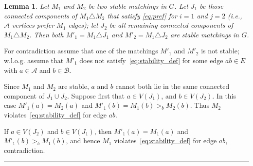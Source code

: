 \documentclass[3p,times]{elsarticle}
\newtheorem{lemma}[fact]{Lemma}
\newenvironment{proof}{{\bf Proof:  }}{\hfill\rule{2mm}{2mm}}
\newcommand{\cA}{\mathcal{A}} \newcommand{\cB}{\mathcal{B}}
\begin{document}
\begin{lemma}\label{lemma:sym_stable} 
  Let $M_1$ and $M_2$ be two stable matchings in $G$. Let $J_1$ be
  those connected components of $M_1 \triangle M_2$ 
  that satisfy
  \eqref{eq:pref} for $i=1$ and $j=2$ (i.e., $\cA$ vertices prefer
  $M_1$ edges); let $J_2$ be all
  remaining connected components of $M_1 \triangle M_2$. 
  Then both $M'_1 = M_1\triangle J_1$ and
  $M'_2=M_1\triangle J_2$ are stable matchings in $G$.
\end{lemma}
\begin{proof}
  For contradiction assume
  that one of the matchings $M'_1$ and $M'_2$ is not stable; w.l.o.g. assume that
  $M'_1$ does not satisfy~\eqref{eq:stability_def} for some edge
  $ab\in E$ with $a\in\mathcal{A}$ and $b\in\mathcal{B}$.

  Since $M_1$ and $M_2$ are stable, $a$ and $b$ cannot both lie in the
  same connected component of $J_1 \cup J_2$. Suppose first that $a \in
  V(J_1)$, and $b \in V(J_2)$. In this case $M'_1(a)=M_2(a)$ and
  $M'_1(b) = M_1(b) >_b M_2(b)$. Thus $M_2$
  violates~\eqref{eq:stability_def} for edge $ab$. 

  If $a\in V(J_2)$
  and $b\in V(J_1)$, then $M'_1(a)=M_1(a)$ and $M'_1(b)>_b M_1(b)$,
  and hence $M_1$ violates~\eqref{eq:stability_def} for edge $ab$,
  contradiction.
\end{proof}
\end{document}

